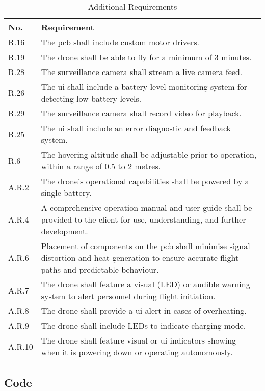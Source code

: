 \begin{table}[H]
\centering
\caption{Additional Requirements}
\begin{tabular}{|>{\centering\arraybackslash}p{} | p{}|}
\hline
\rowcolor{gray!15}
\textbf{No.} & \textbf{Requirement} \\
\hline
R.16 & The \gls{pcb} shall include custom motor drivers. \\
\hline
R.19 & The drone shall be able to fly for a minimum of 3 minutes. \\
\hline
R.28 & The surveillance camera shall stream a live camera feed. \\
\hline
R.26 & The \gls{ui} shall include a battery level monitoring system for detecting low battery levels. \\
\hline
R.29 & The surveillance camera shall record video for playback. \\
\hline
R.25 & The \gls{ui} shall include an error diagnostic and feedback system. \\
\hline
R.6  & The hovering altitude shall be adjustable prior to operation, within a range of 0.5 to 2 metres. \\
\hline
A.R.2 & The drone’s operational capabilities shall be powered by a single battery. \\
\hline
A.R.4 & A comprehensive operation manual and user guide shall be provided to the client for use, understanding, and further development. \\
\hline
A.R.6 & Placement of components on the \gls{pcb} shall minimise signal distortion and heat generation to ensure accurate flight paths and predictable behaviour. \\
\hline
A.R.7 & The drone shall feature a visual (LED) or audible warning system to alert personnel during flight initiation. \\
\hline
A.R.8 & The drone shall provide a \gls{ui} alert in cases of overheating. \\
\hline
A.R.9 & The drone shall include LEDs to indicate charging mode. \\
\hline
A.R.10 & The drone shall feature visual or \gls{ui} indicators showing when it is powering down or operating autonomously. \\
\hline
\end{tabular}
\end{table}

\subsection{Code}
